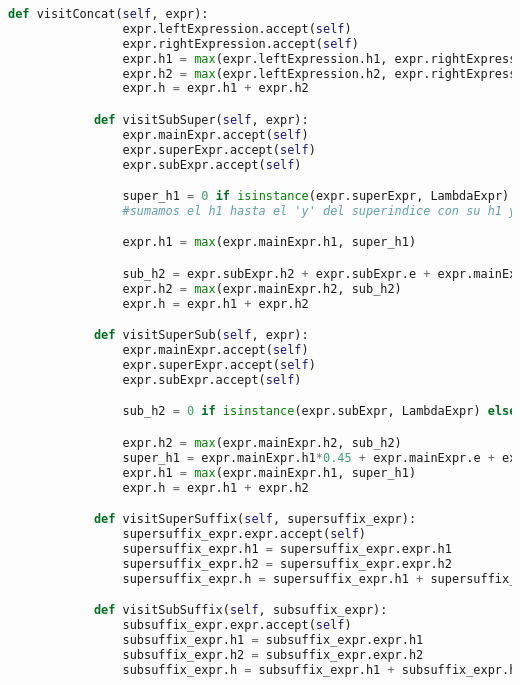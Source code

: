 \begin{lstlisting}[language=Python]
            def visitConcat(self, expr):
                expr.leftExpression.accept(self)
                expr.rightExpression.accept(self)
                expr.h1 = max(expr.leftExpression.h1, expr.rightExpression.h1)
                expr.h2 = max(expr.leftExpression.h2, expr.rightExpression.h2)
                expr.h = expr.h1 + expr.h2

            def visitSubSuper(self, expr):
                expr.mainExpr.accept(self)
                expr.superExpr.accept(self)
                expr.subExpr.accept(self)

                super_h1 = 0 if isinstance(expr.superExpr, LambdaExpr) else expr.mainExpr.h1*0.45 + expr.mainExpr.e + expr.superExpr.h1 - expr.superExpr.e
                #sumamos el h1 hasta el 'y' del superindice con su h1 y le restamos su escala (que sino se suma dos veces)

                expr.h1 = max(expr.mainExpr.h1, super_h1)

                sub_h2 = expr.subExpr.h2 + expr.subExpr.e + expr.mainExpr.h*0.25 - expr.mainExpr.e*0.7 # en un dibujo se ve bien, notar el 0.7 porque los char del mainExpr no miden toda la escala de largo sino que solo el 70% y el restante es espacio vacio
                expr.h2 = max(expr.mainExpr.h2, sub_h2)
                expr.h = expr.h1 + expr.h2

            def visitSuperSub(self, expr):
                expr.mainExpr.accept(self)
                expr.superExpr.accept(self)
                expr.subExpr.accept(self)

                sub_h2 = 0 if isinstance(expr.subExpr, LambdaExpr) else expr.subExpr.h2 + expr.subExpr.e + expr.mainExpr.h*0.25 - expr.mainExpr.e*0.7

                expr.h2 = max(expr.mainExpr.h2, sub_h2)
                super_h1 = expr.mainExpr.h1*0.45 + expr.mainExpr.e + expr.superExpr.h1 - expr.superExpr.e
                expr.h1 = max(expr.mainExpr.h1, super_h1)
                expr.h = expr.h1 + expr.h2

            def visitSuperSuffix(self, supersuffix_expr):
                supersuffix_expr.expr.accept(self)
                supersuffix_expr.h1 = supersuffix_expr.expr.h1
                supersuffix_expr.h2 = supersuffix_expr.expr.h2
                supersuffix_expr.h = supersuffix_expr.h1 + supersuffix_expr.h2

            def visitSubSuffix(self, subsuffix_expr):
                subsuffix_expr.expr.accept(self)
                subsuffix_expr.h1 = subsuffix_expr.expr.h1
                subsuffix_expr.h2 = subsuffix_expr.expr.h2
                subsuffix_expr.h = subsuffix_expr.h1 + subsuffix_expr.h2


\end{lstlisting}
